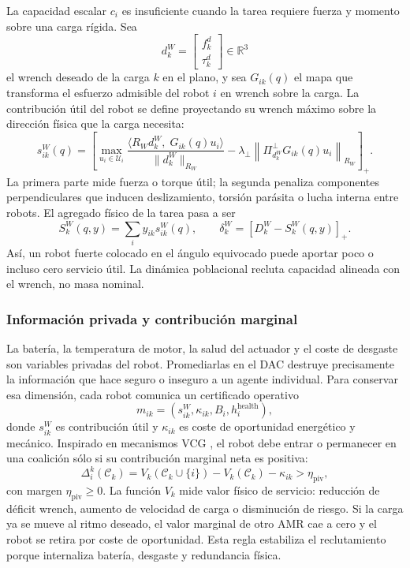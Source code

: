 La capacidad escalar $c_i$ es insuficiente cuando la tarea requiere fuerza y momento
sobre una carga rígida. Sea
\[
  d_k^W=
  \begin{bmatrix}
    f_k^{d}\\
    \tau_k^{d}
  \end{bmatrix}\in\mathbb R^3
\]
el wrench deseado de la carga $k$ en el plano, y sea
$G_{ik}(q)$ el mapa que transforma el esfuerzo admisible del robot $i$ en wrench sobre
la carga. La contribución útil del robot se define proyectando su wrench máximo sobre la
dirección física que la carga necesita:
\begin{equation}
  s_{ik}^{W}(q)
  =
  \left[
  \max_{u_i\in\mathcal U_i}
  \frac{\langle R_W d_k^W,\;G_{ik}(q)u_i\rangle}
       {\|d_k^W\|_{R_W}}
  -
  \lambda_\perp
  \left\|
    \Pi_{d_k^W}^{\perp}G_{ik}(q)u_i
  \right\|_{R_W}
  \right]_+ .
  \label{eq:capacidad_wrench}
\end{equation}
La primera parte mide fuerza o torque útil; la segunda penaliza componentes
perpendiculares que inducen deslizamiento, torsión parásita o lucha interna entre
robots. El agregado físico de la tarea pasa a ser
\begin{equation}
  S_k^W(q,y)=\sum_i y_{ik}s_{ik}^{W}(q),
  \qquad
  \delta_k^W=\left[D_k^W-S_k^W(q,y)\right]_+ .
  \label{eq:deficit_wrench}
\end{equation}
Así, un robot fuerte colocado en el ángulo equivocado puede aportar poco o incluso cero
servicio útil. La dinámica poblacional recluta capacidad alineada con el wrench, no masa
nominal.

\subsubsection{Información privada y contribución marginal}

La batería, la temperatura de motor, la salud del actuador y el coste de desgaste son
variables privadas del robot. Promediarlas en el DAC destruye precisamente la
información que hace seguro o inseguro a un agente individual. Para conservar esa
dimensión, cada robot comunica un certificado operativo
\[
  m_{ik}=(s_{ik}^{W},\kappa_{ik},B_i,h_i^{\mathrm{health}}),
\]
donde $s_{ik}^{W}$ es contribución útil y $\kappa_{ik}$ es coste de oportunidad
energético y mecánico. Inspirado en mecanismos VCG
\citep{vickrey1961counterspeculation,clarke1971multipart,groves1973incentives}, el robot
debe entrar o permanecer en una coalición sólo si su contribución marginal neta es
positiva:
\begin{equation}
  \Delta_i^k(\mathcal C_k)
  =
  V_k(\mathcal C_k\cup\{i\})
  -
  V_k(\mathcal C_k)
  -
  \kappa_{ik}
  >
  \eta_{\mathrm{piv}},
  \label{eq:contribucion_marginal_vcg}
\end{equation}
con margen $\eta_{\mathrm{piv}}\ge0$. La función $V_k$ mide valor físico de servicio:
reducción de déficit wrench, aumento de velocidad de carga o disminución de riesgo. Si
la carga ya se mueve al ritmo deseado, el valor marginal de otro AMR cae a cero y el
robot se retira por coste de oportunidad. Esta regla estabiliza el reclutamiento porque
internaliza batería, desgaste y redundancia física.

